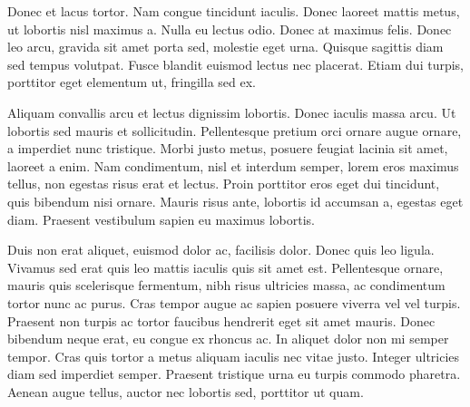 Donec et lacus tortor. Nam congue tincidunt iaculis. Donec laoreet mattis metus, ut lobortis nisl maximus a. Nulla eu lectus odio. Donec at maximus felis. Donec leo arcu, gravida sit amet porta sed, molestie eget urna. Quisque sagittis diam sed tempus volutpat. Fusce blandit euismod lectus nec placerat. Etiam dui turpis, porttitor eget elementum ut, fringilla sed ex.

Aliquam convallis arcu et lectus dignissim lobortis. Donec iaculis massa arcu. Ut lobortis sed mauris et sollicitudin. Pellentesque pretium orci ornare augue ornare, a imperdiet nunc tristique. Morbi justo metus, posuere feugiat lacinia sit amet, laoreet a enim. Nam condimentum, nisl et interdum semper, lorem eros maximus tellus, non egestas risus erat et lectus. Proin porttitor eros eget dui tincidunt, quis bibendum nisi ornare. Mauris risus ante, lobortis id accumsan a, egestas eget diam. Praesent vestibulum sapien eu maximus lobortis.

Duis non erat aliquet, euismod dolor ac, facilisis dolor. Donec quis leo ligula. Vivamus sed erat quis leo mattis iaculis quis sit amet est. Pellentesque ornare, mauris quis scelerisque fermentum, nibh risus ultricies massa, ac condimentum tortor nunc ac purus. Cras tempor augue ac sapien posuere viverra vel vel turpis. Praesent non turpis ac tortor faucibus hendrerit eget sit amet mauris. Donec bibendum neque erat, eu congue ex rhoncus ac. In aliquet dolor non mi semper tempor. Cras quis tortor a metus aliquam iaculis nec vitae justo. Integer ultricies diam sed imperdiet semper. Praesent tristique urna eu turpis commodo pharetra. Aenean augue tellus, auctor nec lobortis sed, porttitor ut quam.





\appendix
%

